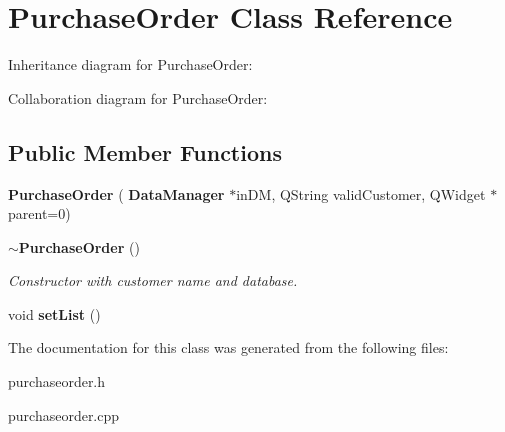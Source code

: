 \section{Purchase\+Order Class Reference}
\label{class_purchase_order}


Inheritance diagram for Purchase\+Order\+:


Collaboration diagram for Purchase\+Order\+:
\subsection*{Public Member Functions}
\begin{DoxyCompactItemize}
\item 
\mbox{\label{class_purchase_order_ae42d679437b6b0815e82ffc7ae14a221}} 
{\bfseries Purchase\+Order} (\textbf{ Data\+Manager} $\ast$in\+DM, Q\+String valid\+Customer, Q\+Widget $\ast$parent=0)
\item 
\mbox{\label{class_purchase_order_a8a25ae25ec31f75ca846209cae90927b}} 
\textbf{ $\sim$\+Purchase\+Order} ()
\begin{DoxyCompactList}\small\item\em Constructor with customer name and database. \end{DoxyCompactList}\item 
\mbox{\label{class_purchase_order_ae5d37ccda133f7608df0d6dfa23e81fd}} 
void {\bfseries set\+List} ()
\end{DoxyCompactItemize}


The documentation for this class was generated from the following files\+:\begin{DoxyCompactItemize}
\item 
purchaseorder.\+h\item 
purchaseorder.\+cpp\end{DoxyCompactItemize}
